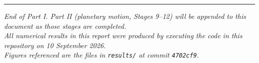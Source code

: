 \documentclass[11pt,a4paper]{article}
\begin{document}
\vfill
\begin{center}
\rule{0.5\textwidth}{0.4pt}
\end{center}

\begin{center}
\small\itshape
End of Part I. Part II (planetary motion, Stages 9--12) will be appended to this document as those
stages are completed.\\[0.5em]
All numerical results in this report were produced by executing the code in this repository on
10 September 2026.\\
Figures referenced are the files in \texttt{results/} at commit \texttt{4702cf9}.
\end{center}
\end{document}
